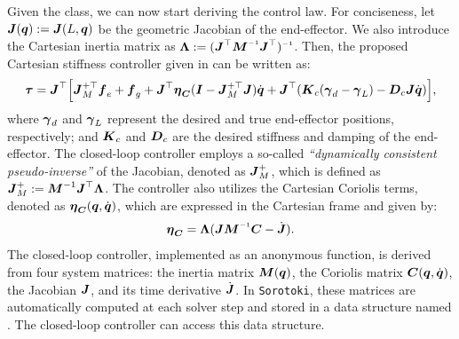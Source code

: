 Given the  class, we can now start deriving the control law. For conciseness, let ${\boldsymbol{J}}({\boldsymbol{q}}) := {\boldsymbol{J}}(L,{\boldsymbol{q}})$ be the geometric Jacobian of the end-effector. We also introduce the Cartesian inertia matrix as $\LambdaB := (\JB^\top \MB \inv \JB^\top)\inv$. Then, the proposed Cartesian stiffness controller given in \cite{DellaSantina2020a} can be written as:
%
\begin{multline}
    \boldsymbol{\tau} = {\boldsymbol{J}}^\top \Big[{\boldsymbol{J}}_M^{+\top} {\boldsymbol{f}}_{e} + {\boldsymbol{f}}_{g} + {\boldsymbol{J}}^\top {\boldsymbol{\eta}}_{{\boldsymbol{C}}}({\boldsymbol{I}} - {\boldsymbol{J}}_M^{+\top}{\boldsymbol{J}}){\dot{\boldsymbol{q}}} + {\boldsymbol{J}}^\top({\boldsymbol{K}}_{c} ({\boldsymbol{\gamma}}_d - {\boldsymbol{\gamma}}_L) - {\boldsymbol{D}}_c {\boldsymbol{J}} {\dot{\boldsymbol{q}}}) \Big ],
    \label{eq:C5:dellasantina_controller}
\end{multline}
%
where ${\boldsymbol{\gamma}}_d$ and ${\boldsymbol{\gamma}}_L$ represent the desired and true end-effector positions, respectively; and ${\boldsymbol{K}}_c$ and ${\boldsymbol{D}}_c$ are the desired stiffness and damping of the end-effector. The closed-loop controller employs a so-called \textit{``dynamically consistent pseudo-inverse''} of the Jacobian, denoted as ${\boldsymbol{J}}_M^{+}$, which is defined as ${\boldsymbol{J}}_M^{+} := {\boldsymbol{M}}^{-1} {\boldsymbol{J}}^\top \boldsymbol{\Lambda}$. The controller also utilizes the Cartesian Coriolis terms, denoted as ${\boldsymbol{\eta}}_{{\boldsymbol{C}}}({\boldsymbol{q}},{\dot{\boldsymbol{q}}})$, which are expressed in the Cartesian frame and given by:
%
\begin{equation}
    \etaB_{\CB} = \LambdaB (\JB \MB\inv \CB - \dot{\JB}).
\end{equation}
%
The closed-loop controller, implemented as an anonymous function, is derived from four system matrices: the inertia matrix ${\boldsymbol{M}}({\boldsymbol{q}})$, the Coriolis matrix ${\boldsymbol{C}}({\boldsymbol{q}},{\dot{\boldsymbol{q}}})$, the Jacobian ${\boldsymbol{J}}$, and its time derivative $\dot{{\boldsymbol{J}}}$. In \texttt{Sorotoki}, these matrices are automatically computed at each solver step and stored in a data structure named . The closed-loop controller can access this data structure. %


    


